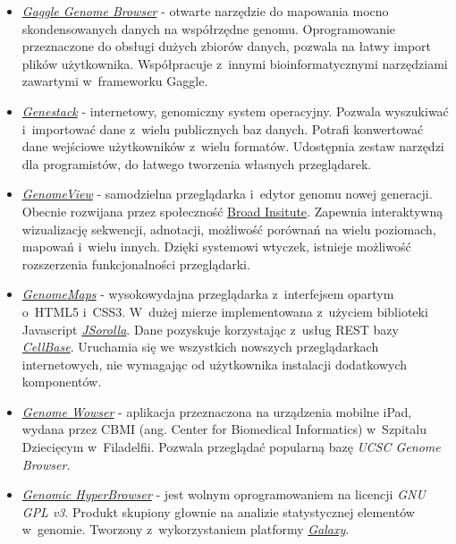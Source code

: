 \begin{itemize}
	\item \href{http://gaggle.systemsbiology.net/docs/geese/genomebrowser/}{\emph{Gaggle Genome Browser}} \label{gaggle} - otwarte narzędzie do mapowania mocno skondensowanych danych na współrzędne genomu. Oprogramowanie przeznaczone do obsługi dużych zbiorów danych, pozwala na łatwy import plików użytkownika. Współpracuje z~innymi bioinformatycznymi narzędziami zawartymi w~frameworku Gaggle.
	
	\item \href{https://genestack.com/}{\emph{Genestack}} \label{genestack} - internetowy, genomiczny system operacyjny. Pozwala wyszukiwać i~importować dane z~wielu publicznych baz danych. Potrafi konwertować dane wejściowe użytkowników z~wielu formatów. Udostępnia zestaw narzędzi dla programistów, do łatwego tworzenia własnych przeglądarek.
	
	\item \href{http://genomeview.org/}{\emph{GenomeView}} \label{genomeview} - samodzielna przeglądarka i~edytor genomu nowej generacji. Obecnie rozwijana przez społeczność \href{http://www.broadinstitute.org/}{Broad Insitute}. Zapewnia interaktywną wizualizację sekwencji, adnotacji, możliwość porównań na wielu poziomach, mapowań i~wielu innych. Dzięki systemowi wtyczek, istnieje możliwość rozszerzenia funkcjonalności przeglądarki.
	
	\item \href{http://www.genomemaps.org/}{\emph{GenomeMaps}} \label{genomemaps} - wysokowydajna przeglądarka z~interfejsem opartym o~HTML5 i~CSS3. W~dużej mierze implementowana z~użyciem biblioteki Javascript \href{https://github.com/opencb/jsorolla}{\mbox{\emph{JSorolla}}}. Dane pozyskuje korzystając z~usług REST bazy \href{https://github.com/opencb/cellbase/wiki}{\emph{CellBase}}. Uruchamia się we wszystkich nowszych przeglądarkach internetowych, nie wymagając od użytkownika instalacji dodatkowych komponentów.
	
	\item \href{http://www.popsci.com/science/article/2011-06/introducing-genome-wowser-ipad-app-lets-you-browse-human-genome}{\emph{Genome Wowser}} - aplikacja przeznaczona na urządzenia mobilne iPad, wydana przez CBMI (ang. Center for Biomedical Informatics) w~Szpitalu Dziecięcym w~Filadelfii. Pozwala przeglądać popularną bazę \emph{UCSC Genome Browser}.
	
	\item \href{https://hyperbrowser.uio.no/hb/}{\emph{Genomic HyperBrowser}} - jest wolnym oprogramowaniem na licencji \emph{GNU GPL v3}. Produkt skupiony głownie na analizie statystycznej elementów w~genomie. Tworzony z~wykorzystaniem platformy \href{https://en.wikipedia.org/wiki/Galaxy_(computational_biology)}{\emph{Galaxy}}.
	

\end{itemize}
